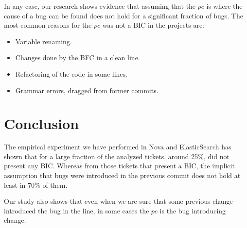 \documentclass[conference]{IEEEtran}
\begin{document}
In any case, our research shows evidence that assuming that the $pc$ is where the cause of a bug can be found does not hold for a significant fraction of bugs. The most common reasons for the $pc$ was not a BIC in the projects are:

\begin{itemize}
  \item Variable renaming.
  \item Changes done by the BFC in a clean line.
  \item Refactoring of the code in some lines.
  \item Grammar errors, dragged from former commits.
\end{itemize} 
%

\section{Conclusion}
The empirical experiment we have performed in Nova and ElasticSearch has shown that for a large fraction of the analyzed tickets, around 25\%, did not present any BIC. Whereas from those tickets that present a BIC, the implicit assumption that bugs were introduced in the previous commit does not hold at least in 70\% of them.

Our study also shows that even when we are sure that some previous change introduced the bug in the line, in some cases the $pc$ is the bug introducing change. %
\end{document}
